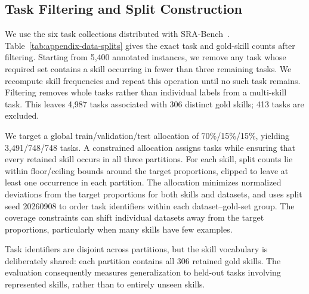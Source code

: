 \subsection{Task Filtering and Split Construction}
\label{app:data-splits}
We use the six task collections distributed with SRA-Bench~\citep{su2026skillretrieval}. Table~\ref{tab:appendix-data-splits} gives the exact task and gold-skill counts after filtering. Starting from 5,400 annotated instances, we remove any task whose required set contains a skill occurring in fewer than three remaining tasks. We recompute skill frequencies and repeat this operation until no such task remains. Filtering removes whole tasks rather than individual labels from a multi-skill task. This leaves 4,987 tasks associated with 306 distinct gold skills; 413 tasks are excluded.

We target a global train/validation/test allocation of 70\%/15\%/15\%, yielding 3,491/748/748 tasks. A constrained allocation assigns tasks while ensuring that every retained skill occurs in all three partitions. For each skill, split counts lie within floor/ceiling bounds around the target proportions, clipped to leave at least one occurrence in each partition. The allocation minimizes normalized deviations from the target proportions for both skills and datasets, and uses split seed 20260908 to order task identifiers within each dataset--gold-set group. The coverage constraints can shift individual datasets away from the target proportions, particularly when many skills have few examples.

Task identifiers are disjoint across partitions, but the skill vocabulary is deliberately shared: each partition contains all 306 retained gold skills. The evaluation consequently measures generalization to held-out tasks involving represented skills, rather than to entirely unseen skills.

